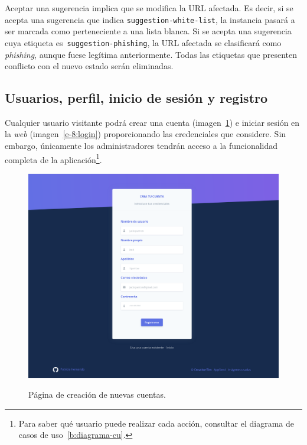Aceptar una sugerencia implica que se modifica la URL afectada. Es decir, si se acepta una sugerencia que indica \texttt{suggestion-white-list}, la instancia pasará a ser marcada como perteneciente a una lista blanca. Si se acepta una sugerencia cuya etiqueta es~\texttt{suggestion-phishing}, la URL afectada se clasificará como \textit{phishing}, aunque fuese legítima anteriormente. Todas las etiquetas que presenten conflicto con el nuevo estado serán eliminadas.

\subsection{Usuarios, perfil, inicio de sesión y registro}

Cualquier usuario visitante podrá crear una cuenta (imagen~\ref{e-8:register}) e iniciar sesión en la \textit{web} (imagen~\ref{e-8:login}) proporcionando las credenciales que considere. Sin embargo, únicamente los administradores tendrán acceso a la funcionalidad completa de la aplicación\footnote{Para saber qué usuario puede realizar cada acción, consultar el diagrama de casos de uso~\ref{b:diagrama-cu}.}.

\begin{figure}[h]
	\caption[Manual de usuario: crear nueva cuenta]{Página de creación de nuevas cuentas.}
	\centering
	\includegraphics[width=\textwidth]{../img/anexos/user_guide/8_register}
	\label{e-8:register}
\end{figure}


